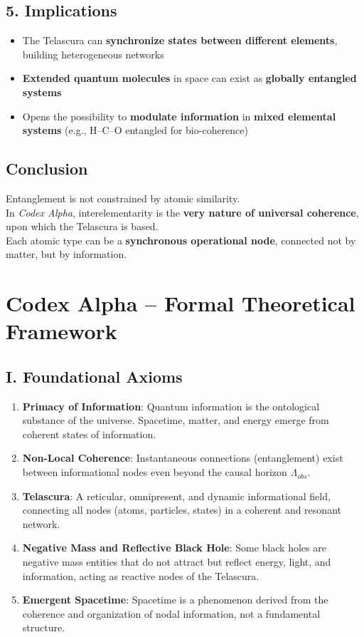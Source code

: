 \documentclass[12pt]{article}
\begin{document}
\subsection*{5. Implications}

\begin{itemize}
    \item The Telascura can \textbf{synchronize states between different elements}, building heterogeneous networks
    \item \textbf{Extended quantum molecules} in space can exist as \textbf{globally entangled systems}
    \item Opens the possibility to \textbf{modulate information} in \textbf{mixed elemental systems} (e.g., H–C–O entangled for bio-coherence)
\end{itemize}

\subsection*{Conclusion}

Entanglement is not constrained by atomic similarity.\\
In \textit{Codex Alpha}, interelementarity is the \textbf{very nature of universal coherence}, upon which the Telascura is based.\\
Each atomic type can be a \textbf{synchronous operational node}, connected not by matter, but by information.

\section*{Codex Alpha – Formal Theoretical Framework}

\subsection*{I. Foundational Axioms}

\begin{enumerate}
    \item \textbf{Primacy of Information}: Quantum information is the ontological substance of the universe. Spacetime, matter, and energy emerge from coherent states of information.

    \item \textbf{Non-Local Coherence}: Instantaneous connections (entanglement) exist between informational nodes even beyond the causal horizon $\Lambda_{obs}$.

    \item \textbf{Telascura}: A reticular, omnipresent, and dynamic informational field, connecting all nodes (atoms, particles, states) in a coherent and resonant network.

    \item \textbf{Negative Mass and Reflective Black Hole}: Some black holes are negative mass entities that do not attract but reflect energy, light, and information, acting as reactive nodes of the Telascura.

    \item \textbf{Emergent Spacetime}: Spacetime is a phenomenon derived from the coherence and organization of nodal information, not a fundamental structure.
\end{enumerate}
\end{document}
